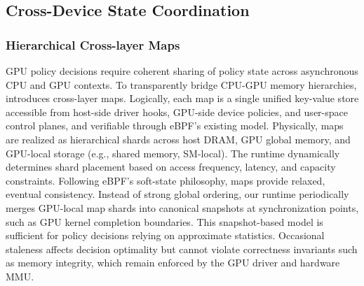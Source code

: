 
\subsection{Cross-Device State Coordination}

\subsubsection{Hierarchical Cross-layer Maps}

GPU policy decisions require coherent sharing of policy state across asynchronous CPU and GPU contexts. To transparently bridge CPU-GPU memory hierarchies, \sys introduces cross-layer maps. Logically, each map is a single unified key-value store accessible from host-side driver hooks, GPU-side device policies, and user-space control planes, and verifiable through eBPF's existing model. Physically, maps are realized as hierarchical shards across host DRAM, GPU global memory, and GPU-local storage (e.g., shared memory, SM-local). The runtime dynamically determines shard placement based on access frequency, latency, and capacity constraints. Following eBPF's soft-state philosophy, \sys maps provide relaxed, eventual consistency. Instead of strong global ordering, our runtime periodically merges GPU-local map shards into canonical snapshots at synchronization points, such as GPU kernel completion boundaries. This snapshot-based model is sufficient for policy decisions relying on approximate statistics. Occasional staleness affects decision optimality but cannot violate correctness invariants such as memory integrity, which remain enforced by the GPU driver and hardware MMU.
